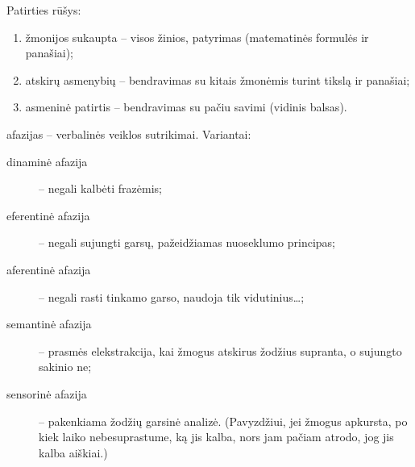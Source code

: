 Patirties rūšys:

\begin{enumerate}
  \item žmonijos sukaupta – visos žinios, patyrimas (matematinės formulės
    ir panašiai);
  \item atskirų asmenybių – bendravimas su kitais žmonėmis turint tikslą
    ir panašiai;
  \item asmeninė patirtis – bendravimas su pačiu savimi (vidinis balsas).
\end{enumerate}

\Glspl{afazija} – verbalinės veiklos sutrikimai. Variantai:

\begin{description}
  \item[dinaminė afazija] – negali kalbėti frazėmis;
  \item[eferentinė afazija] – negali sujungti garsų, pažeidžiamas nuoseklumo
    principas;
  \item[aferentinė afazija] – negali rasti tinkamo garso, naudoja tik
    vidutinius…; %
  \item[semantinė afazija]  – prasmės elekstrakcija, 
    kai žmogus atskirus žodžius supranta, o sujungto sakinio ne;
  \item[sensorinė afazija] – pakenkiama žodžių garsinė analizė. (Pavyzdžiui,
    jei žmogus apkursta, po kiek laiko nebesuprastume, ką jis kalba, nors
    jam pačiam atrodo, jog jis kalba aiškiai.)
\end{description}
